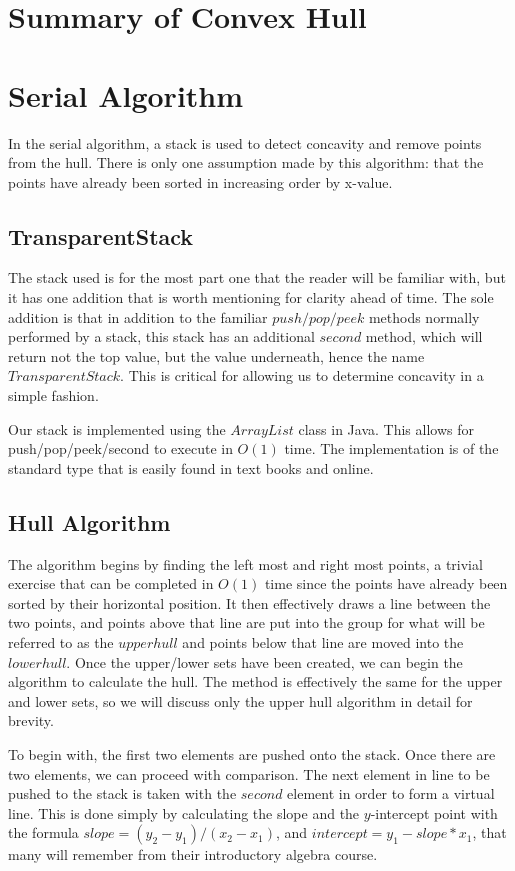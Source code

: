 \documentclass[conference]{IEEEtran}
\begin{document}
\section{Summary of Convex Hull}


\section{Serial Algorithm}

In the serial algorithm, a stack is used to detect concavity and remove points from the hull. There is only one assumption made by this algorithm: that the points have already been sorted in increasing order by x-value. 

\subsection{TransparentStack}
The stack used is for the most part one that the reader will be familiar with, but it has one addition that is worth mentioning for clarity ahead of time. The sole addition is that in addition to the familiar $push/pop/peek$ methods normally performed by a stack, this stack has an additional $second$ method, which will return not the top value, but the value underneath, hence the name $TransparentStack$. This is critical for allowing us to determine concavity in a simple fashion.

Our stack is implemented using the $ArrayList$ class in Java. This allows for push/pop/peek/second to execute in $O(1)$ time. The implementation is of the standard type that is easily found in text books and online.

\subsection{Hull Algorithm}
The algorithm begins by finding the left most and right most points, a trivial exercise that can be completed in $O(1)$ time since the points have already been sorted by their horizontal position. It then effectively draws a line between the two points, and points above that line are put into the group for what will be referred to as the $upper hull$ and points below that line are moved into the $lower hull$. Once the upper/lower sets have been created, we can begin the algorithm to calculate the hull. The method is effectively the same for the upper and lower sets, so we will discuss only the upper hull algorithm in detail for brevity.

To begin with, the first two elements are pushed onto the stack. Once there are two elements, we can proceed with comparison. The next element in line to be pushed to the stack is taken with the $second$ element in order to form a virtual line. This is done simply by calculating the slope and the $y$-intercept point with the formula $slope = (y_2 - y_1)/(x_2 - x_1)$, and $intercept = y_1 - slope * x_1$, that many will remember from their introductory algebra course.
\end{document}
